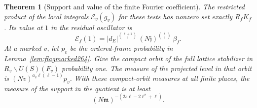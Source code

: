 \documentclass[a4paper,11pt]{article}
\newtheorem{theorem}[proposition]{Theorem}
\theoremstyle{definition}
\theoremstyle{remark}
\numberwithin{equation}{section}
\begin{document}
\begin{theorem}[Support and value of the finite Fourier coefficient]\leavevmode
\label{thm:flagfinite264}
The restricted product of the local integrals
\(\mathcal E_v(g_v)\) for these tests has nonzero set exactly
\(R_fK_f\). Its value at \(1\) in the residual oscillator is
\[
  \mathcal E_f(1)
    = |d_E|^{\binom{\ell+1}{3}}\,
      (N\mathfrak j)^{\binom{\ell}{3}}\ \beta_f .
\]
At a marked \(v\), let \(p_v\) be the ordered-frame probability
in Lemma~\ref{lem:flagmarked264}. Give the compact orbit of the
full lattice stabilizer in \(R_v\backslash U(S)(F_v)\) probability
one. The measure of the projected level in that orbit is
\((Nv)^{a_v\ell(\ell-1)}p_v\). With these compact-orbit measures
at all finite places, the measure of the support in the quotient
is at least
\[
                (N\mathfrak m)^{-(2s\ell-2\ell^2+\ell)} .
\]
\end{theorem}
\end{document}
